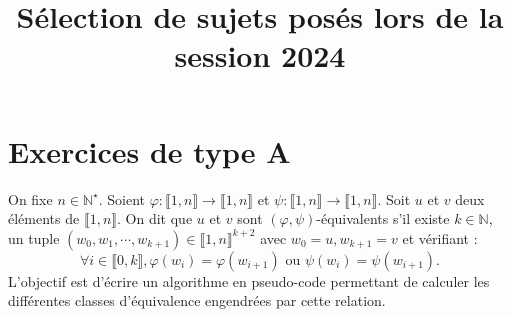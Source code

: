 \documentclass{ccinp}
\begin{document}
\title{Sélection de sujets posés lors de la session 2024}
\date{}



\maketitle
\thispagestyle{fancy}

\section*{Exercices de type A}



On fixe $n\in \mathbb{N}^{\star}$. Soient  $\varphi : \llbracket 1,n\rrbracket \to \llbracket 1,n \rrbracket $ et $\psi : \llbracket 1,n\rrbracket \to  \llbracket 1,n\rrbracket$.
Soit $u$ et  $v$ deux éléments
de  $\llbracket 1,n \rrbracket$. On dit que  $u$ et  $v$ sont $(\varphi,\psi)$-équivalents s'il existe  $k\in \mathbb{N}$, un tuple $(w_0,w_1,\cdots , w_{k+1}) \in \llbracket 1,n \rrbracket^{k+2}$ avec $w_0=u, w_{k+1}= v$ et vérifiant : 
$$ \forall i \in \llbracket 0,k \rrbracket, \varphi(w_{i})=\varphi(w_{i+1}) \mbox { ou } \psi(w_{i})=\psi(w_{i+1}).$$
L'objectif est d'écrire un algorithme en pseudo-code permettant de calculer les différentes classes d'équivalence engendrées par cette relation. 
\end{document}
